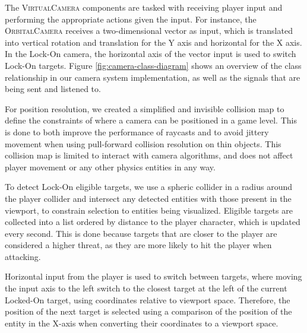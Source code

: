 The \textsc{VirtualCamera} components are tasked with receiving player input and performing the appropriate actions given the input. For instance, the \textsc{OrbitalCamera} receives a two-dimensional vector as input, which is translated into vertical rotation and translation for the Y axis and horizontal for the X axis. In the Lock-On camera, the horizontal axis of the vector input is used to switch Lock-On targets. Figure \ref{fig:camera-class-diagram} shows an overview of the class relationship in our camera system implementation, as well as the signals that are being sent and listened to.



For position resolution, we created a simplified and invisible collision map to define the constraints of where a camera can be positioned in a game level. This is done to both improve the performance of raycasts and to avoid jittery movement when using pull-forward collision resolution on thin objects. This collision map is limited to interact with camera algorithms, and does not affect player movement or any other physics entities in any way.

To detect Lock-On eligible targets, we use a spheric collider in a radius around the player collider and intersect any detected entities with those present in the viewport, to constrain selection to entities being visualized. Eligible targets are collected into a list ordered by distance to the player character, which is updated every second. This is done because targets that are closer to the player are considered a higher threat, as they are more likely to hit the player when attacking.

Horizontal input from the player is used to switch between targets, where moving the input axis to the left switch to the closest target at the left of the current Locked-On target, using coordinates relative to viewport space. Therefore, the position of the next target is selected using a comparison of the position of the entity in the X-axis when converting their coordinates to a viewport space.

